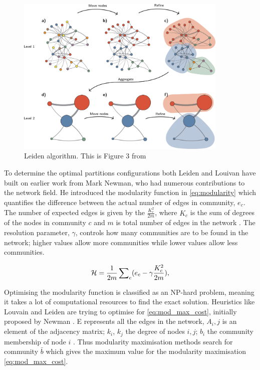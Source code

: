 \begin{figure}[!htb]    
    \centering
\includegraphics[width=0.9\textwidth,height=0.9\textheight,keepaspectratio]{Sections/Lit_review/Resources/Leiden_algorithm.png}
    \caption{Leiden algorithm. This is Figure 3 from \citet{Traag2019-ne}}
    \label{fig:N_I:leiden-explained}
\end{figure}



To determine the optimal partitions configurations both Leiden and Louivan have built on earlier work from Mark Newman, who had numerous contributions to the network field. He introduced the modularity function in \cref{eq:modularity} \cite{Newman2004-dd} which quantifies the difference between the actual number of edges in community, $e_c$. The number of expected edges is given by the $\frac{K_c^2}{2m}$, where $K_c$ is the sum of degrees of the nodes in community $c$ and $m$ is total number of edges in the network \cite{Traag2019-ne}. The resolution parameter, $\gamma$, controls how many communities are to be found in the network; higher values allow more communities while lower values allow less communities.


\begin{equation} \label{eq:modularity}
    {\mathcal H} =\frac{1}{2m}\,{\sum }_{c}({e}_{c}-{\rm{\gamma }}\frac{{K}_{c}^{2}}{2m}),
\end{equation}

Optimising the modularity function is classified as an NP-hard problem, meaning it takes a lot of computational resources to find the exact solution. Heuristics like Louvain and Leiden are trying to optimise for \cref{eq:mod_max_cost}, initially proposed by Newman \cite{Newman2006-fa}. E represents all the edges in the network, $A_i,j$ is an element of the adjacency matrix; $k_i$, $k_j$ the degree of nodes $i,j$; $b_i$ the community membership of node $i$ \cite{Peixoto2021-jx}. Thus modularity maximisation methods search for community $\bar{b}$ which gives the maximum value for the modularity maximisation \cref{eq:mod_max_cost}.

